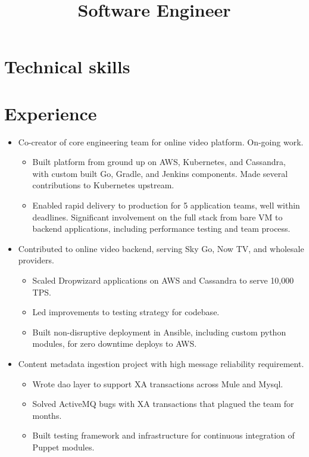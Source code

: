 \documentclass[11pt,a4paper,roman]{moderncv}
\title{Software Engineer}
\begin{document}
\makecvtitle{}

\section{Technical skills}

\section{Experience}

\begin{itemize}
\item Co-creator of core engineering team for online video platform. On-going work.
  \begin{itemize}
  \item Built platform from ground up on AWS, Kubernetes, and Cassandra, with custom built Go, Gradle, and Jenkins components. Made several contributions to Kubernetes upstream.
  \item Enabled rapid delivery to production for 5 application teams, well within deadlines. Significant involvement on the full stack from bare VM to backend applications, including performance testing and team process.
  \end{itemize}
\item Contributed to online video backend, serving Sky Go, Now TV, and wholesale providers.
  \begin{itemize}
  \item Scaled Dropwizard applications on AWS and Cassandra to serve 10,000 TPS.\@
  \item Led improvements to testing strategy for codebase.
  \item Built non-disruptive deployment in Ansible, including custom python modules, for zero downtime deploys to AWS.\@
  \end{itemize}
\item Content metadata ingestion project with high message reliability requirement.
  \begin{itemize}
  \item Wrote dao layer to support XA transactions across Mule and Mysql.
  \item Solved ActiveMQ bugs with XA transactions that plagued the team for months.
  \item Built testing framework and infrastructure for continuous integration of Puppet modules.
  \end{itemize}
\end{itemize}
\end{document}
